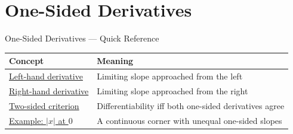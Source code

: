 \section{One-Sided Derivatives}

\begin{toolkitbox}{One-Sided Derivatives --- Quick Reference}
\small
\begin{tabular}{l l}
\toprule
\textbf{Concept} & \textbf{Meaning} \\
\midrule
\hyperref[def:left-hand-derivative]{Left-hand derivative} & Limiting slope approached from the left \\
\hyperref[def:right-hand-derivative]{Right-hand derivative} & Limiting slope approached from the right \\
\hyperref[thm:differentiability-and-one-sided-derivatives]{Two-sided criterion} & Differentiability iff both one-sided derivatives agree \\
\hyperref[ex:abs-corner]{Example: \(|x|\) at \(0\)} & A continuous corner with unequal one-sided slopes \\
\bottomrule
\end{tabular}
\end{toolkitbox}


